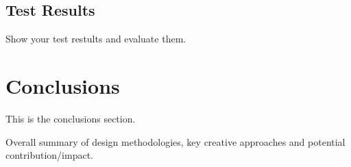 \documentclass{article}
\begin{document}
\subsection{Test Results}
Show your test restults and evaluate them. 

\section{Conclusions}
This is the conclusions section.

Overall summary of design methodologies, key creative approaches and potential
contribution/impact. \cite{hahahaha}





 
\end{document}
